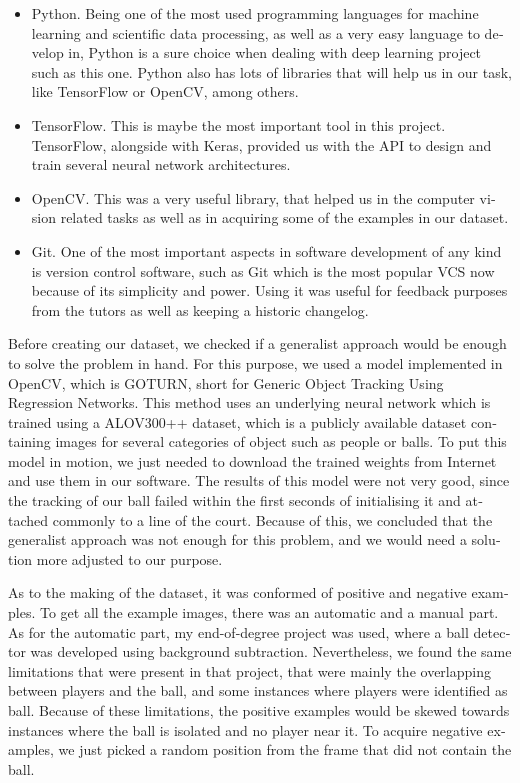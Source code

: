\begin{otherlanguage}{english}
\begin{itemize}
    \item Python. Being one of the most used programming languages for machine learning and scientific data processing, as well as a very easy language to develop in, Python is a sure choice when dealing with deep learning project such as this one. Python also has lots of libraries that will help us in our task, like TensorFlow or OpenCV, among others.
    \item TensorFlow. This is maybe the most important tool in this project. TensorFlow, alongside with Keras, provided us with the API to design and train several neural network architectures.
    \item OpenCV. This was a very useful library, that helped us in the computer vision related tasks as well as in acquiring some of the examples in our dataset.
    \item Git. One of the most important aspects in software development of any kind is version control software, such as Git which is the most popular VCS now because of its simplicity and power. Using it was useful for feedback purposes from the tutors as well as keeping a historic changelog.
\end{itemize}

Before creating our dataset, we checked if a generalist approach would be enough to solve the problem in hand. For this purpose, we used a model implemented in OpenCV, which is GOTURN, short for Generic Object Tracking Using Regression Networks. This method uses an underlying neural network which is trained using a ALOV300++ dataset, which is a publicly available dataset containing images for several categories of object such as people or balls. To put this model in motion, we just needed to download the trained weights from Internet and use them in our software. The results of this model were not very good, since the tracking of our ball failed within the first seconds of initialising it and attached commonly to a line of the court. Because of this, we concluded that the generalist approach was not enough for this problem, and we would need a solution more adjusted to our purpose.

As to the making of the dataset, it was conformed of positive and negative examples. To get all the example images, there was an automatic and a manual part. As for the automatic part, my end-of-degree project was used, where a ball detector was developed using background subtraction. Nevertheless, we found the same limitations that were present in that project, that were mainly the overlapping between players and the ball, and some instances where players were identified as ball. Because of these limitations, the positive examples would be skewed towards instances where the ball is isolated and no player near it. To acquire negative examples, we just picked a random position from the frame that did not contain the ball.


\end{otherlanguage}
